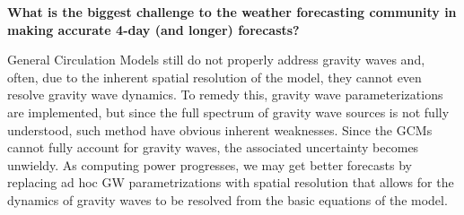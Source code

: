 \textbf{What is the biggest challenge to the weather forecasting
community in making accurate 4-day (and longer) forecasts?}

General Circulation Models still do not properly address gravity waves
and, often, due to the inherent spatial resolution of the model, they
cannot even resolve gravity wave dynamics. To remedy this, gravity wave
parameterizations are implemented, but since the full spectrum of
gravity wave sources is not fully understood, such method have obvious
inherent weaknesses. Since the GCMs cannot fully account for gravity
waves, the associated uncertainty becomes unwieldy. As computing power
progresses, we may get better forecasts by replacing ad hoc GW
parametrizations with spatial resolution that allows for the dynamics of
gravity waves to be resolved from the basic equations of the model.


